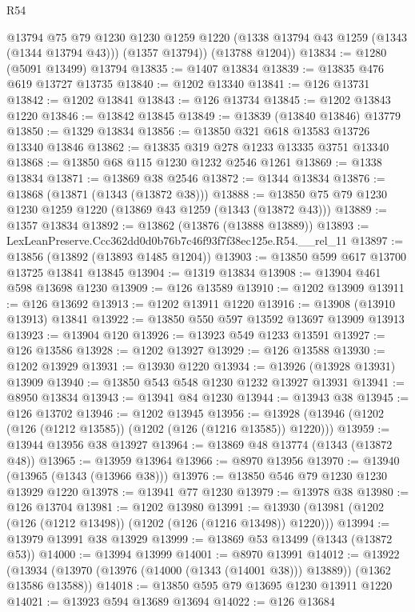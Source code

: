 \begin{lexlean}{R54}
\begin{coremodule}
        @13794
        @75
        @79
        @1230
        @1230
        @1259
        @1220
        (@1338 @13794 @43 @1259 (@1343 (@1344 @13794 @43)))
        (@1357 @13794))
      (@13788 @1204))
@13834 := @1280 (@5091 @13499) @13794
@13835 := @1407 @13834
@13839 := @13835 @476 @619 @13727 @13735
@13840 := @1202 @13340
@13841 := @126 @13731
@13842 := @1202 @13841
@13843 := @126 @13734
@13845 := @1202 @13843 @1220
@13846 := @13842 @13845
@13849 := @13839 (@13840 @13846) @13779
@13850 := @1329 @13834
@13856 := @13850 @321 @618 @13583 @13726 @13340 @13846
@13862 := @13835 @319 @278 @1233 @13335 @3751 @13340
@13868 := @13850 @68 @115 @1230 @1232 @2546 @1261
@13869 := @1338 @13834
@13871 := @13869 @38 @2546
@13872 := @1344 @13834
@13876 := @13868 (@13871 (@1343 (@13872 @38)))
@13888 := @13850 @75 @79 @1230 @1230 @1259 @1220 (@13869 @43 @1259 (@1343 (@13872 @43)))
@13889 := @1357 @13834
@13892 := @13862 (@13876 (@13888 @13889))
@13893 := LexLeanPreserve.Ccc362dd0d0b76b7c46f93f7f38ec125e.R54.__rel_11
@13897 := @13856 (@13892 (@13893 @1485 @1204))
@13903 := @13850 @599 @617 @13700 @13725 @13841 @13845
@13904 := @1319 @13834
@13908 := @13904 @461 @598 @13698 @1230
@13909 := @126 @13589
@13910 := @1202 @13909
@13911 := @126 @13692
@13913 := @1202 @13911 @1220
@13916 := @13908 (@13910 @13913) @13841
@13922 := @13850 @550 @597 @13592 @13697 @13909 @13913
@13923 := @13904 @120
@13926 := @13923 @549 @1233 @13591
@13927 := @126 @13586
@13928 := @1202 @13927
@13929 := @126 @13588
@13930 := @1202 @13929
@13931 := @13930 @1220
@13934 := @13926 (@13928 @13931) @13909
@13940 := @13850 @543 @548 @1230 @1232 @13927 @13931
@13941 := @8950 @13834
@13943 := @13941 @84 @1230
@13944 := @13943 @38
@13945 := @126 @13702
@13946 := @1202 @13945
@13956 := @13928 (@13946 (@1202 (@126 (@1212 @13585)) (@1202 (@126 (@1216 @13585)) @1220)))
@13959 := @13944 @13956 @38 @13927
@13964 := @13869 @48 @13774 (@1343 (@13872 @48))
@13965 := @13959 @13964
@13966 := @8970 @13956
@13970 := @13940 (@13965 (@1343 (@13966 @38)))
@13976 := @13850 @546 @79 @1230 @1230 @13929 @1220
@13978 := @13941 @77 @1230
@13979 := @13978 @38
@13980 := @126 @13704
@13981 := @1202 @13980
@13991 := @13930 (@13981 (@1202 (@126 (@1212 @13498)) (@1202 (@126 (@1216 @13498)) @1220)))
@13994 := @13979 @13991 @38 @13929
@13999 := @13869 @53 @13499 (@1343 (@13872 @53))
@14000 := @13994 @13999
@14001 := @8970 @13991
@14012 := @13922
    (@13934 (@13970 (@13976 (@14000 (@1343 (@14001 @38))) @13889)) (@1362 @13586 @13588))
@14018 := @13850 @595 @79 @13695 @1230 @13911 @1220
@14021 := @13923 @594 @13689 @13694
@14022 := @126 @13684

\end{coremodule}
\end{lexlean}
